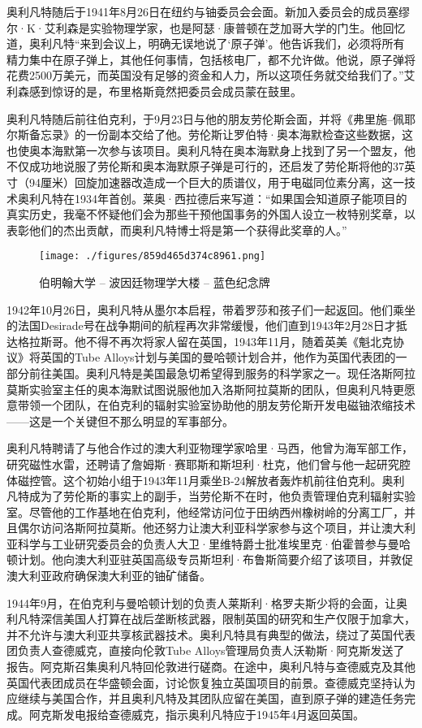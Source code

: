 奥利凡特随后于1941年8月26日在纽约与铀委员会会面。新加入委员会的成员塞缪尔·K·艾利森是实验物理学家，也是阿瑟·康普顿在芝加哥大学的门生。他回忆道，奥利凡特“来到会议上，明确无误地说了‘原子弹’。他告诉我们，必须将所有精力集中在原子弹上，其他任何事情，包括核电厂，都不允许做。他说，原子弹将花费2500万美元，而英国没有足够的资金和人力，所以这项任务就交给我们了。”艾利森感到惊讶的是，布里格斯竟然把委员会成员蒙在鼓里。

奥利凡特随后前往伯克利，于9月23日与他的朋友劳伦斯会面，并将《弗里施–佩耶尔斯备忘录》的一份副本交给了他。劳伦斯让罗伯特·奥本海默检查这些数据，这也使奥本海默第一次参与该项目。奥利凡特在奥本海默身上找到了另一个盟友，他不仅成功地说服了劳伦斯和奥本海默原子弹是可行的，还启发了劳伦斯将他的37英寸（94厘米）回旋加速器改造成一个巨大的质谱仪，用于电磁同位素分离，这一技术奥利凡特在1934年首创。莱奥·西拉德后来写道：“如果国会知道原子能项目的真实历史，我毫不怀疑他们会为那些干预他国事务的外国人设立一枚特别奖章，以表彰他们的杰出贡献，而奥利凡特博士将是第一个获得此奖章的人。”
\begin{figure}[ht]
\centering
\texttt{[image: ./figures/859d465d374c8961.png]}
\caption{伯明翰大学 – 波因廷物理学大楼 – 蓝色纪念牌} \label{fig_MKalft_7}
\end{figure}
1942年10月26日，奥利凡特从墨尔本启程，带着罗莎和孩子们一起返回。他们乘坐的法国Desirade号在战争期间的航程再次非常缓慢，他们直到1943年2月28日才抵达格拉斯哥。他不得不再次将家人留在英国，1943年11月，随着英美《魁北克协议》将英国的Tube Alloys计划与美国的曼哈顿计划合并，他作为英国代表团的一部分前往美国。奥利凡特是美国最急切希望得到服务的科学家之一。现任洛斯阿拉莫斯实验室主任的奥本海默试图说服他加入洛斯阿拉莫斯的团队，但奥利凡特更愿意带领一个团队，在伯克利的辐射实验室协助他的朋友劳伦斯开发电磁铀浓缩技术——这是一个关键但不那么明显的军事部分。

奥利凡特聘请了与他合作过的澳大利亚物理学家哈里·马西，他曾为海军部工作，研究磁性水雷，还聘请了詹姆斯·赛耶斯和斯坦利·杜克，他们曾与他一起研究腔体磁控管。这个初始小组于1943年11月乘坐B-24解放者轰炸机前往伯克利。奥利凡特成为了劳伦斯的事实上的副手，当劳伦斯不在时，他负责管理伯克利辐射实验室。尽管他的工作基地在伯克利，他经常访问位于田纳西州橡树岭的分离工厂，并且偶尔访问洛斯阿拉莫斯。他还努力让澳大利亚科学家参与这个项目，并让澳大利亚科学与工业研究委员会的负责人大卫·里维特爵士批准埃里克·伯霍普参与曼哈顿计划。他向澳大利亚驻英国高级专员斯坦利·布鲁斯简要介绍了该项目，并敦促澳大利亚政府确保澳大利亚的铀矿储备。

1944年9月，在伯克利与曼哈顿计划的负责人莱斯利·格罗夫斯少将的会面，让奥利凡特深信美国人打算在战后垄断核武器，限制英国的研究和生产仅限于加拿大，并不允许与澳大利亚共享核武器技术。奥利凡特具有典型的做法，绕过了英国代表团负责人查德威克，直接向伦敦Tube Alloys管理局负责人沃勒斯·阿克斯发送了报告。阿克斯召集奥利凡特回伦敦进行磋商。在途中，奥利凡特与查德威克及其他英国代表团成员在华盛顿会面，讨论恢复独立英国项目的前景。查德威克坚持认为应继续与美国合作，并且奥利凡特及其团队应留在美国，直到原子弹的建造任务完成。阿克斯发电报给查德威克，指示奥利凡特应于1945年4月返回英国。

